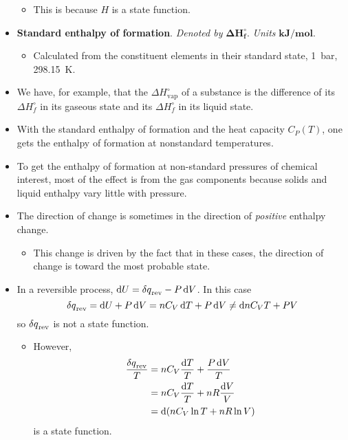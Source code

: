 \documentclass[../notes.tex]{subfiles}
\begin{document}
\begin{itemize}
\begin{itemize}
        \item This is because $H$ is a state function.
    \end{itemize}
    \item \textbf{Standard enthalpy of formation}. \emph{Denoted by} $\bm{\Delta H_f^\circ}$. \emph{Units} $\textbf{kJ}\bm{/}\textbf{mol}$.
    \begin{itemize}
        \item Calculated from the constituent elements in their standard state, \SI{1}{\bar}, \SI{298.15}{\kelvin}.
    \end{itemize}
    \item We have, for example, that the $\Delta H_\text{vap}^\circ$ of a substance is the difference of its $\Delta H_f^\circ$ in its gaseous state and its $\Delta H_f^\circ$ in its liquid state.
    \item With the standard enthalpy of formation and the heat capacity $C_P(T)$, one gets the enthalpy of formation at nonstandard temperatures.
    \item To get the enthalpy of formation at non-standard pressures of chemical interest, most of the effect is from the gas components because solids and liquid enthalpy vary little with pressure.
    \item The direction of change is sometimes in the direction of \emph{positive} enthalpy change.
    \begin{itemize}
        \item This change is driven by the fact that in these cases, the direction of change is toward the most probable state.
    \end{itemize}
    \item In a reversible process, $\dd{U}=\var{q}_\text{rev}-P\dd{V}$. In this case
    \begin{equation*}
        \var{q}_\text{rev} = \dd{U}+P\dd{V} = nC_V\dd{T}+P\dd{V} \neq \dd{nC_VT+PV}
    \end{equation*}
    so $\var{q}_\text{rev}$ is not a state function.
    \begin{itemize}
        \item However,
        \begin{align*}
            \frac{\var{q}_\text{rev}}{T} &= nC_V\frac{\dd{T}}{T}+\frac{P\dd{V}}{T}\\
            &= nC_V\frac{\dd{T}}{T}+nR\frac{\dd{V}}{V}\\
            &= \dd{(nC_V\ln T+nR\ln V)}
        \end{align*}
        is a state function.
    \end{itemize}
\end{itemize}
\end{document}
